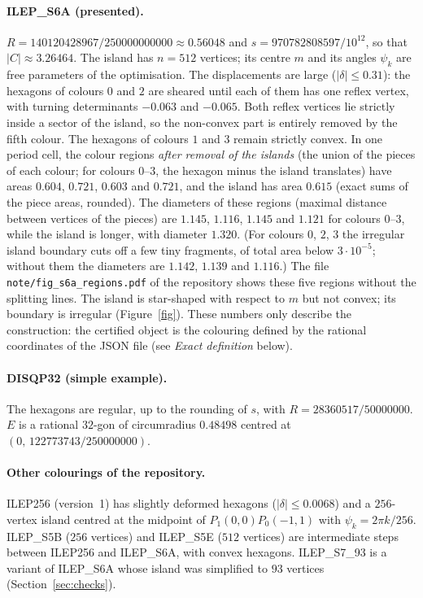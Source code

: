 \documentclass[10pt,a4paper]{article}
\begin{document}
\paragraph{ILEP\_S6A (presented).} $R=140120428967/250000000000\approx0.56048$ and
$s=970782808597/10^{12}$, so that $|C|\approx3.26464$. The island has $n=512$ vertices; its centre $m$ and its
angles $\psi_k$ are free parameters of the optimisation. The displacements are large ($|\delta|\le0.31$): the
hexagons of colours $0$ and $2$ are sheared until each of them has one reflex vertex, with turning
determinants $-0.063$ and $-0.065$. Both reflex vertices lie strictly inside a sector of the island, so the
non-convex part is entirely removed by the fifth colour. The hexagons of colours $1$ and $3$ remain strictly
convex. In one period cell, the colour regions \emph{after removal of the islands} (the union of the pieces of each
colour; for colours $0$--$3$, the hexagon minus the island translates) have areas $0.604$, $0.721$, $0.603$ and
$0.721$, and the island has area $0.615$ (exact sums of the piece areas, rounded). The diameters of these
regions (maximal distance between vertices of the pieces) are $1.145$, $1.116$, $1.145$ and $1.121$ for
colours $0$--$3$, while the island is longer, with diameter $1.320$. (For colours $0$, $2$, $3$ the irregular
island boundary cuts off a few tiny fragments, of total area below $3\cdot10^{-5}$; without them the diameters
are $1.142$, $1.139$ and $1.116$.) The file \texttt{note/fig\_s6a\_regions.pdf} of the repository shows these five regions without
the splitting lines. The island is star-shaped with respect to $m$ but
not convex; its boundary is irregular (Figure~\ref{fig}). These numbers only describe the construction: the
certified object is the colouring defined by the rational coordinates of the JSON file (see \emph{Exact
definition} below).

\paragraph{DISQP32 (simple example).} The hexagons are regular, up to the rounding of $s$, with $R=28360517/50000000$.
$E$ is a rational $32$-gon of circumradius $0.48498$ centred at $(0,\,122773743/250000000)$.

\paragraph{Other colourings of the repository.} ILEP256 (version~1) has slightly deformed hexagons
($|\delta|\le0.0068$) and a $256$-vertex island centred at the midpoint of $P_1(0,0)P_0(-1,1)$ with
$\psi_k=2\pi k/256$. ILEP\_S5B ($256$ vertices) and ILEP\_S5E ($512$ vertices) are intermediate steps between
ILEP256 and ILEP\_S6A, with convex hexagons. ILEP\_S7\_93 is a variant of ILEP\_S6A whose island was
simplified to $93$ vertices (Section~\ref{sec:checks}).
\end{document}
